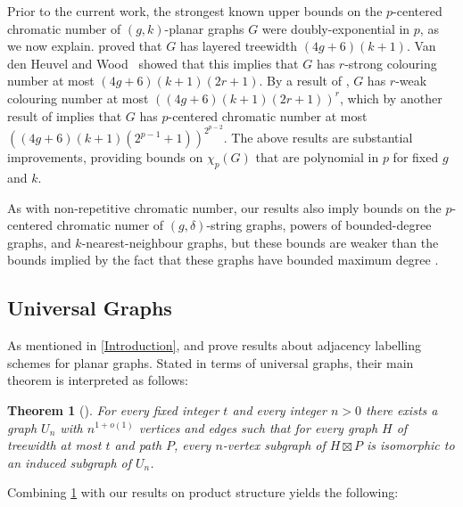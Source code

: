 \documentclass{patmorin}
\theoremstyle{plain}
\newtheorem{thm}{Theorem}
\theoremstyle{definition}
\begin{document}
Prior to the current work, the strongest known upper bounds on the $p$-centered chromatic number of $(g,k)$-planar graphs $G$ were doubly-exponential in $p$, as we now explain. \citet{dujmovic.eppstein.ea:structure} proved that $G$ has layered treewidth $(4g+6)(k+1)$.
Van den Heuvel and Wood~\citep{vdHW18} showed that this implies that $G$  has $r$-strong colouring number at most $(4g + 6)(k + 1)(2r + 1)$. By a result of \citet{zhu:colouring}, $G$ has $r$-weak colouring number at most $( (4g + 6)(k + 1)(2r + 1) )^r$, which by another result of  \citet{zhu:colouring} implies that $G$ has  $p$-centered chromatic number at most $( (4g+6)(k+1)(2^{p-1} + 1) )^{2^{p-2}}$. The above results are substantial improvements, providing bounds on $\chi_p(G)$ that are polynomial in $p$ for fixed $g$ and $k$.

As with non-repetitive chromatic number, our results also imply bounds on the $p$-centered chromatic numer of $(g,\delta)$-string graphs, powers of bounded-degree graphs, and $k$-nearest-neighbour graphs, but these bounds are weaker than the bounds implied by the fact that these graphs have bounded maximum degree \cite{DFMS21}.

\subsection{Universal Graphs}

As mentioned in \cref{Introduction}, \citet{DEJGMM21} and \citet{EJM} prove results about adjacency labelling schemes for planar graphs. Stated in terms of universal graphs, their main theorem is interpreted as follows:

\begin{thm}[\citep{DEJGMM21,EJM}]
	\label{Universal}
	For every fixed integer $t$ and every integer $n>0$ there exists a
	graph $U_n$ with $n^{1+o(1)}$ vertices and edges such that for every graph $H$ of treewidth at most $t$ and path $P$, every $n$-vertex subgraph of $H\boxtimes P$ is isomorphic to an induced subgraph of $U_n$.
\end{thm}

Combining \cref{Universal} with our results on product structure yields the following:
\end{document}
